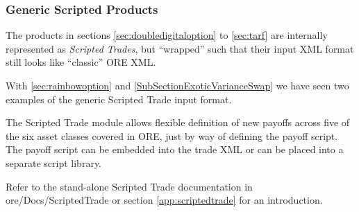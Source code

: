 \subsubsection{Generic Scripted Products}
\label{sec:genericscriptedproducts}

The products in sections \ref{sec:doubledigitaloption} to \ref{sec:tarf} are internally represented as {\em Scripted Trades},
but ``wrapped'' such that their input XML format still looks like ``classic'' ORE XML.

With \ref{sec:rainbowoption} and \ref{SubSectionExoticVarianceSwap} we have seen two examples of the generic Scripted Trade input format.

The Scripted Trade module allows flexible definition of new payoffs across five of the six asset classes covered in ORE,
just by way of defining the payoff script. The payoff script can be embedded into the trade XML or can be placed into a separate
script library.

Refer to the stand-alone Scripted Trade documentation in ore/Docs/ScriptedTrade or section \ref{app:scriptedtrade} for an
introduction.
